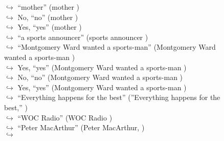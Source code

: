 \documentclass[11pt,a4paper, onecolumn]{article}
\begin{document}
\begin{figure}[t] \small \begin{tcolorbox}[boxsep=0pt,left=5pt,right=0pt,top=2pt,colback = yellow!5] \begin{dialogue}
 \small 
\colorbox{pink!25}{$\hookrightarrow$}
{ ``mother'' (mother ) }
\\
\colorbox{pink!25}{$\hookrightarrow$}
\colorbox{red!25}{No,}
{ ``no'' (mother ) }
\\
\colorbox{pink!25}{$\hookrightarrow$}
\colorbox{red!25}{Yes,}
{ ``yes'' (mother ) }
\\
\colorbox{pink!25}{$\hookrightarrow$}
{ ``a sports announcer'' (sports announcer ) }
\\
\colorbox{pink!25}{$\hookrightarrow$}
{ ``Montgomery Ward wanted a sports-man'' (Montgomery Ward wanted a sports-man ) }
\\
\colorbox{pink!25}{$\hookrightarrow$}
\colorbox{red!25}{Yes,}
{ ``yes'' (Montgomery Ward wanted a sports-man ) }
\\
\colorbox{pink!25}{$\hookrightarrow$}
\colorbox{red!25}{No,}
{ ``no'' (Montgomery Ward wanted a sports-man ) }
\\
\colorbox{pink!25}{$\hookrightarrow$}
\colorbox{red!25}{Yes,}
{ ``yes'' (Montgomery Ward wanted a sports-man ) }
\\
\colorbox{pink!25}{$\hookrightarrow$}
{ ``Everything happens for the best'' (''Everything happens for the best,'' ) }
\\
\colorbox{pink!25}{$\hookrightarrow$}
{ ``WOC Radio'' (WOC Radio ) }
\\
\colorbox{pink!25}{$\hookrightarrow$}
{ ``Peter MacArthur'' (Peter MacArthur, ) }
\\
\colorbox{pink!25}{$\hookrightarrow$}

\end{dialogue}
\end{tcolorbox}
\end{figure}
\end{document}
